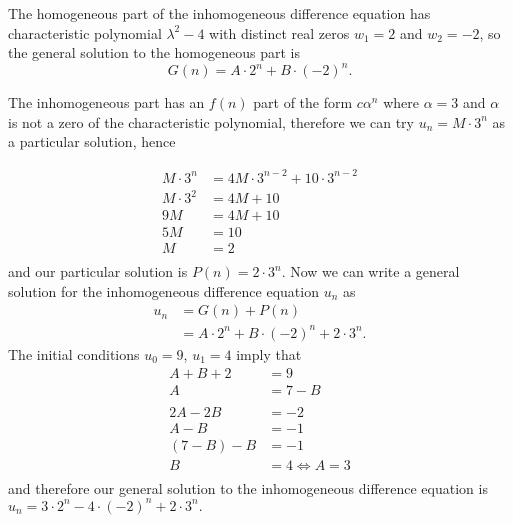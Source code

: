 \documentclass[10pt]{article}
\begin{document}
\begin{enumerate}
\begin{enumerate}
                The homogeneous part of the inhomogeneous difference equation
                has characteristic polynomial $\lambda^2 - 4$ with distinct
                real zeros $w_1 = 2$ and $w_2 = -2$, so the general solution to
                the homogeneous part is
                $$G(n) = A\cdot2^n + B\cdot(-2)^n.$$

                The inhomogeneous part has an $f(n)$ part of the form
                $c\alpha^n$ where $\alpha = 3$ and $\alpha$ is not a zero of
                the characteristic polynomial, therefore we can try $u_n =
                M\cdot3^n$ as a particular solution, hence

                \begin{align*}
                    M\cdot3^n &= 4M\cdot3^{n - 2} + 10 \cdot 3^{n - 2} \\
                    M\cdot3^2 &= 4M + 10 \\
                    9M &= 4M + 10 \\
                    5M &= 10 \\
                    M &= 2 \\
                \end{align*}
                and our particular solution is $P(n) = 2\cdot3^n$.
                Now we can write a general solution for the inhomogeneous
                difference equation $u_n$ as
                \begin{align*}
                    u_n &= G(n) + P(n) \\
                        &= A\cdot2^n + B\cdot(-2)^n + 2\cdot3^n.
                \end{align*}
                The initial conditions $u_0 = 9$, $u_1 = 4$ imply that
                \begin{align*}
                    A + B + 2 &= 9 \\
                    A &= 7 - B  \\
                    \\
                    2A - 2B &= -2 \\
                    A - B &= -1 \\
                    (7 - B) - B &= -1 \\
                    B &= 4  \Leftrightarrow A = 3 \\
                \end{align*}
                and therefore our general solution to the inhomogeneous
                difference equation is
                        $u_n = 3\cdot2^n - 4\cdot(-2)^n + 2\cdot3^n.$

\end{enumerate}
\end{enumerate}
\end{document}
